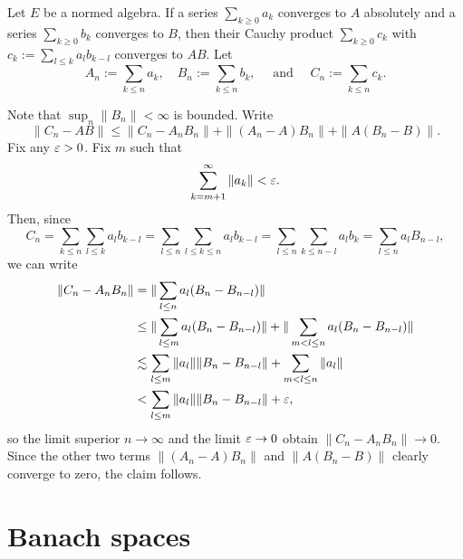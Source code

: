 \documentclass{../../large}
\begin{document}
\begin{prb}
\end{prb}


\begin{prb}
Let $E$ be a normed algebra.
If a series $\sum_{k\ge0}a_k$ converges to $A$ absolutely and a series $\sum_{k\ge0}b_k$ converges to $B$, then their Cauchy product $\sum_{k\ge0}c_k$ with $c_k:=\sum_{l\le k}a_lb_{k-l}$ converges to $AB$.
Let
\[A_n:=\sum_{k\le n}a_k,\quad B_n:=\sum_{k\le n}b_k,\quad\text{ and }\quad C_n:=\sum_{k\le n}c_k.\]
\end{prb}
\begin{pf}
Note that $\sup_n\|B_n\|<\infty$ is bounded.
Write
\[\|C_n-AB\|\le\|C_n-A_nB_n\|+\|(A_n-A)B_n\|+\|A(B_n-B)\|.\]
Fix any $\varepsilon>0$.
Fix $m$ such that
\[\sum_{k=m+1}^\infty\|a_k\|<\varepsilon.\]
Then, since
\[C_n=\sum_{k\le n}\sum_{l\le k}a_lb_{k-l}=\sum_{l\le n}\sum_{l\le k\le n}a_lb_{k-l}=\sum_{l\le n}\sum_{k\le n-l}a_lb_k=\sum_{l\le n}a_lB_{n-l},\]
we can write
\begin{align*}
\|C_n-A_nB_n\|
&=\|\sum_{l\le n}a_l(B_n-B_{n-l})\|\\
&\le\|\sum_{l\le m}a_l(B_n-B_{n-l})\|+\|\sum_{m<l\le n}a_l(B_n-B_{n-l})\|\\
&\lesssim\sum_{l\le m}\|a_l\|\|B_n-B_{n-l}\|+\sum_{m<l\le n}\|a_l\|\\
&<\sum_{l\le m}\|a_l\|\|B_n-B_{n-l}\|+\varepsilon,
\end{align*}
so the limit superior $n\to\infty$ and the limit $\varepsilon\to0$ obtain $\|C_n-A_nB_n\|\to0$.
Since the other two terms $\|(A_n-A)B_n\|$ and $\|A(B_n-B)\|$ clearly converge to zero, the claim follows.
\end{pf}




\section{Banach spaces}
\end{document}
